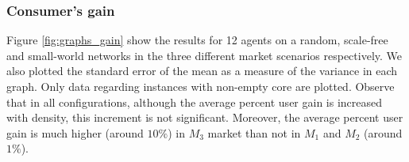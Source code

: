 \documentclass[11pt, twoside, titlepage, a4paper, openright]{report}
\begin{document}
\subsubsection{Consumer's gain}

Figure \ref{fig:graphs_gain} show the results
for 12 agents on a random, scale-free and small-world networks in the three
different market scenarios respectively.
We also plotted the standard error of the mean as a measure of the
variance in each graph. Only data regarding instances with non-empty core are
plotted. Observe that in all configurations, although the average percent user
gain is increased with density, this increment is not significant. Moreover, the
average percent user gain is much higher (around $10\%$) in $M_3$ market than not
in $M_1$ and $M_2$ (around $1\%$).


\end{document}
